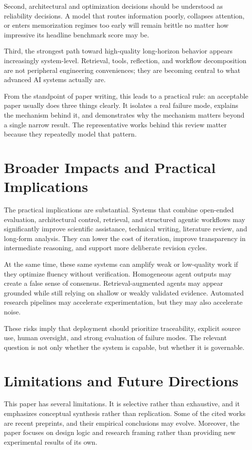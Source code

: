 Second, architectural and optimization decisions should be understood as reliability decisions. A model that routes information poorly, collapses attention, or enters memorization regimes too early will remain brittle no matter how impressive its headline benchmark score may be.

Third, the strongest path toward high-quality long-horizon behavior appears increasingly system-level. Retrieval, tools, reflection, and workflow decomposition are not peripheral engineering conveniences; they are becoming central to what advanced AI systems actually are.

From the standpoint of paper writing, this leads to a practical rule: an acceptable paper usually does three things clearly. It isolates a real failure mode, explains the mechanism behind it, and demonstrates why the mechanism matters beyond a single narrow result. The representative works behind this review matter because they repeatedly model that pattern.

\section{Broader Impacts and Practical Implications}
The practical implications are substantial. Systems that combine open-ended evaluation, architectural control, retrieval, and structured agentic workflows may significantly improve scientific assistance, technical writing, literature review, and long-form analysis. They can lower the cost of iteration, improve transparency in intermediate reasoning, and support more deliberate revision cycles.

At the same time, these same systems can amplify weak or low-quality work if they optimize fluency without verification. Homogeneous agent outputs may create a false sense of consensus. Retrieval-augmented agents may appear grounded while still relying on shallow or weakly validated evidence. Automated research pipelines may accelerate experimentation, but they may also accelerate noise.

These risks imply that deployment should prioritize traceability, explicit source use, human oversight, and strong evaluation of failure modes. The relevant question is not only whether the system is capable, but whether it is governable.

\section{Limitations and Future Directions}
This paper has several limitations. It is selective rather than exhaustive, and it emphasizes conceptual synthesis rather than replication. Some of the cited works are recent preprints, and their empirical conclusions may evolve. Moreover, the paper focuses on design logic and research framing rather than providing new experimental results of its own.

